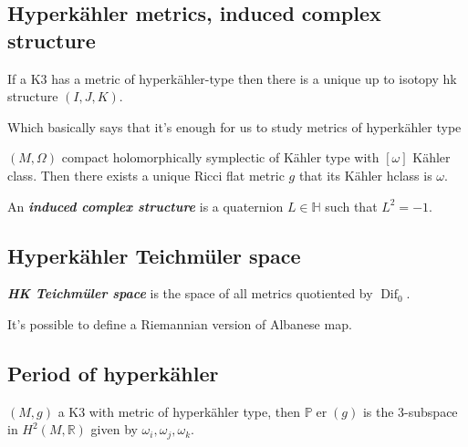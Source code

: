 \subsection{Hyperkähler metrics, induced complex structure}


\begin{claim}\leavevmode
	If a K3 has a metric of hyperkähler-type then there is a unique up to isotopy hk structure $(I,J,K)$.
\end{claim}

\begin{remark}\leavevmode
	Which basically says that it's enough for us to study metrics of hyperkähler type 
\end{remark}

\begin{thm}\leavevmode
	$(M,\Omega)$ compact holomorphically symplectic of Kähler type with $[\omega]$ Kähler class. Then there exists a unique Ricci flat metric $g$ that its  Kähler hclass is $\omega$.
\end{thm}

\begin{defn}\leavevmode
	An \textit{\textbf{induced complex structure}} is a quaternion $L \in \mathbb{H}$ such that $L^2=-1$.
\end{defn}

\subsection{Hyperkähler Teichmüler space}

\begin{defn}\leavevmode
	\textit{\textbf{HK Teichmüler space}} is the space of all metrics quotiented by $\operatorname{Dif}_0$.
\end{defn}

\begin{remark}\leavevmode
	It's possible to define a Riemannian version of Albanese map.
\end{remark}

\subsection{Period of hyperkähler}

\begin{defn}\leavevmode
	$(M,g)$ a K3 with metric of hyperkähler type, then $\mathbb{P}\operatorname{er}(g)$ is the 3-subspace in $H^{2}(M,\mathbb{R})$ given by $\omega_i, \omega_j, \omega_k$.
\end{defn}

